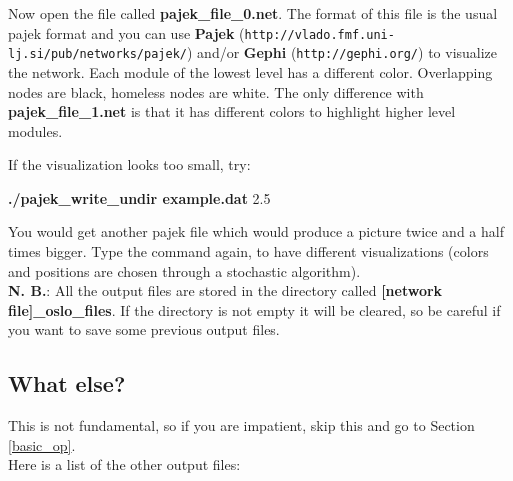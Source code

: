 \documentclass[11pt]{article}
\begin{document}
Now open the file called \textbf{pajek\_file\_0.net}. The format of
this file is the usual pajek format and you can use {\bf Pajek}
({\tt http://vlado.fmf.uni-lj.si/pub/networks/pajek/}) and/or {\bf Gephi}
({\tt http://gephi.org/}) to visualize the network. 
Each module of the lowest level has a different color. Overlapping nodes are
black, homeless nodes are white. 
The only difference with \textbf{pajek\_file\_1.net} is that it has different colors to highlight higher level modules.

If the visualization looks too small, try:

{ \textbf{./pajek\_write\_undir example.dat} 2.5 }

You would get another pajek file which would produce a picture twice
and a half times bigger. Type the command again, 
to have different visualizations (colors and positions are chosen through a stochastic algorithm).
\\


\textbf{N. B.}: All the output files are stored in the directory called
\textbf{[network file]\_oslo\_files}. 
If the directory is not empty it will be cleared, so be careful if you want to save some previous output files.

\subsection{What else?}

This is not fundamental, so if you are impatient, skip this and go to Section \ref{basic_op}.
\\

 Here is a list of the other output files:
\end{document}
